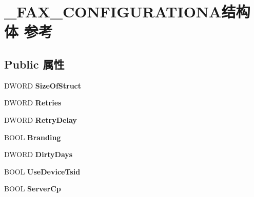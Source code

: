 \hypertarget{struct___f_a_x___c_o_n_f_i_g_u_r_a_t_i_o_n_a}{}\section{\+\_\+\+F\+A\+X\+\_\+\+C\+O\+N\+F\+I\+G\+U\+R\+A\+T\+I\+O\+N\+A结构体 参考}
\label{struct___f_a_x___c_o_n_f_i_g_u_r_a_t_i_o_n_a}
\subsection*{Public 属性}
\begin{DoxyCompactItemize}
\item 
\mbox{\label{struct___f_a_x___c_o_n_f_i_g_u_r_a_t_i_o_n_a_a9275784fe8cae6e79d29a49e3f5711dc}} 
D\+W\+O\+RD {\bfseries Size\+Of\+Struct}
\item 
\mbox{\label{struct___f_a_x___c_o_n_f_i_g_u_r_a_t_i_o_n_a_a6f777adf04636f34b35018f739ba0588}} 
D\+W\+O\+RD {\bfseries Retries}
\item 
\mbox{\label{struct___f_a_x___c_o_n_f_i_g_u_r_a_t_i_o_n_a_a318030402f8dee0acf9fb2d1c116cdb3}} 
D\+W\+O\+RD {\bfseries Retry\+Delay}
\item 
\mbox{\label{struct___f_a_x___c_o_n_f_i_g_u_r_a_t_i_o_n_a_a4a15d645ff77cb84423369ec83d6559d}} 
B\+O\+OL {\bfseries Branding}
\item 
\mbox{\label{struct___f_a_x___c_o_n_f_i_g_u_r_a_t_i_o_n_a_aaf351ce63cd33201cc62ff0fd66b3230}} 
D\+W\+O\+RD {\bfseries Dirty\+Days}
\item 
\mbox{\label{struct___f_a_x___c_o_n_f_i_g_u_r_a_t_i_o_n_a_a902cc50bd1f0bfc1def2d0cceb8aea9d}} 
B\+O\+OL {\bfseries Use\+Device\+Tsid}
\item 
\mbox{\label{struct___f_a_x___c_o_n_f_i_g_u_r_a_t_i_o_n_a_a79a37a4556b1a6db22467c2d5506a827}} 
B\+O\+OL {\bfseries Server\+Cp}

\end{DoxyCompactItemize}

